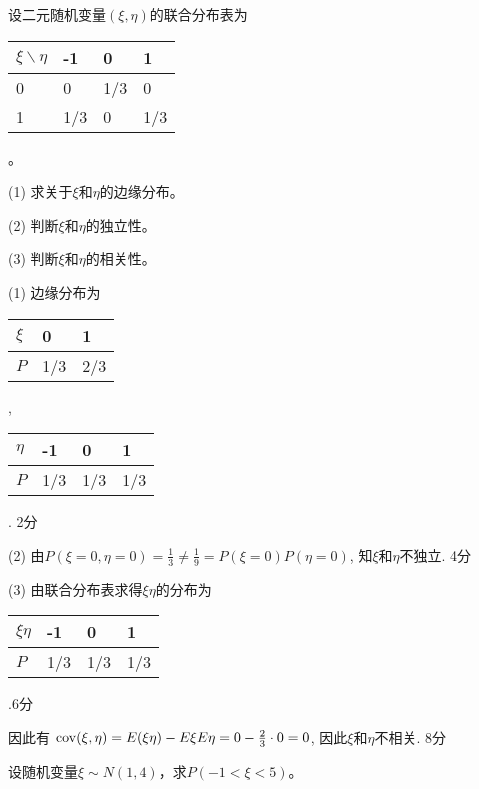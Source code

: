 \documentclass[answer]{USTBExam}
\begin{document}


\begin{problem}
设二元随机变量$(\xi, \eta)$的联合分布表为
\begin{tabular}{|l|l|l|l|}
  \hline
  $\xi \backslash \eta$ & -1 & 0 & 1\\
  \hline
  0 & 0 & 1/3 & 0\\
  \hline
  1 & 1/3 & 0 & 1/3\\
  \hline
\end{tabular}。\par
(1) 求关于$\xi$和$\eta$的边缘分布。\par
(2) 判断$\xi$和$\eta$的独立性。\par
(3) 判断$\xi$和$\eta$的相关性。
\end{problem}

\bigskip

\begin{solution}
(1) 边缘分布为 \begin{tabular}{|l|l|l|}
  \hline
  $\xi$ & 0 & 1\\
  \hline
  $P$ & 1/3 & 2/3\\
  \hline
\end{tabular}, \ \begin{tabular}{|l|l|l|l|}
  \hline
  $\eta$ & -1 & 0 & 1\\
  \hline
  $P$ & 1/3 & 1/3 & 1/3\\
  \hline
\end{tabular}. \dotfill 2分 \par
(2) 由$P(\xi = 0, \eta = 0) = \frac{1}{3} \neq \frac{1}{9} = P(\xi = 0) P(\eta = 0)$,
知$\xi$和$\eta$不独立. \dotfill 4分 \par
(3) 由联合分布表求得$\xi \eta$的分布为 \begin{tabular}{|l|l|l|l|}
  \hline
  $\xi \eta$ & -1 & 0 & 1\\
  \hline
  $P$ & 1/3 & 1/3 & 1/3\\
  \hline
\end{tabular}.\dotfill 6分\par
因此有 $\operatorname{\operatorname{cov}}(\xi, \eta) = E(\xi\eta) - E\xi E\eta = 0 -\frac{2}{3} \cdot 0 = 0$,
因此$\xi$和$\eta$不相关. \dotfill 8分
\end{solution}


\begin{problem}
设随机变量$\xi \sim N (1, 4)$，求$P (- 1 < \xi < 5)$。
\end{problem}
\end{document}
